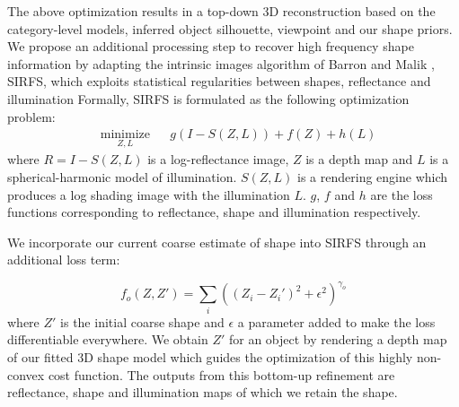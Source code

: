 The above optimization results in a top-down 3D reconstruction based on the category-level models, inferred object silhouette, viewpoint and our shape priors. We propose an additional processing step to recover high frequency shape information by adapting the intrinsic images algorithm of Barron and Malik \cite{barronPAMI13,Barron2012B}, SIRFS, which exploits statistical regularities between shapes, reflectance and illumination 
Formally, SIRFS is formulated as the following optimization problem:
\begin{equation*}
\begin{aligned}
& \underset{Z,L}{\text{minimize}}
& & g(I-S(Z,L))+f(Z)+h(L)
\end{aligned}
\end{equation*}
where $R=I-S(Z,L)$ is a log-reflectance image, $Z$ is a depth map and $L$ is a spherical-harmonic model of illumination. $S(Z,L)$ is a rendering engine which produces a log shading image with the illumination $L$. $g$, $f$ and $h$ are the loss functions corresponding to reflectance, shape and illumination respectively.

We incorporate our current coarse estimate of shape into SIRFS through an additional loss term:

\begin{equation*}
f_o(Z,Z') = \underset{i}{\sum}((Z_i-Z_i')^2+\epsilon^2)^{\gamma_o}
\end{equation*}
where $Z'$ is the initial coarse shape and $\epsilon$ a parameter added to make the loss differentiable everywhere. We obtain $Z'$ for an object by rendering a depth map of our fitted 3D shape model which guides the optimization of this highly non-convex cost function. The outputs from this bottom-up refinement are reflectance, shape and illumination maps of which we retain the shape.
